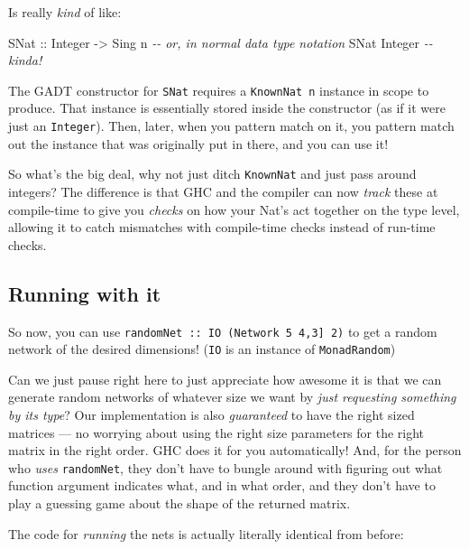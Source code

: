 \documentclass[]{article}
\newenvironment{Shaded}{}{}
\newcommand{\CommentTok}[1]{\textcolor[rgb]{0.38,0.63,0.69}{\textit{#1}}}
\newcommand{\DataTypeTok}[1]{\textcolor[rgb]{0.56,0.13,0.00}{#1}}
\newcommand{\NormalTok}[1]{#1}
\newcommand{\OtherTok}[1]{\textcolor[rgb]{0.00,0.44,0.13}{#1}}
\begin{document}
Is really \emph{kind} of like:

\begin{Shaded}
\begin{Highlighting}[]
\DataTypeTok{SNat}\OtherTok{ ::} \DataTypeTok{Integer} \OtherTok{{-}>} \DataTypeTok{Sing}\NormalTok{ n}
\CommentTok{{-}{-} or, in normal data type notation}
\DataTypeTok{SNat} \DataTypeTok{Integer}
\CommentTok{{-}{-} kinda!}
\end{Highlighting}
\end{Shaded}

The GADT constructor for \texttt{SNat} requires a \texttt{KnownNat\ n} instance
in scope to produce. That instance is essentially stored inside the constructor
(as if it were just an \texttt{Integer}). Then, later, when you pattern match on
it, you pattern match out the instance that was originally put in there, and you
can use it!

So what's the big deal, why not just ditch \texttt{KnownNat} and just pass
around integers? The difference is that GHC and the compiler can now
\emph{track} these at compile-time to give you \emph{checks} on how your Nat's
act together on the type level, allowing it to catch mismatches with
compile-time checks instead of run-time checks.

\hypertarget{running-with-it}{%
\subsection{Running with it}\label{running-with-it}}

So now, you can use
\texttt{randomNet\ ::\ IO\ (Network\ 5\ \textquotesingle{}{[}4,3{]}\ 2)} to get
a random network of the desired dimensions! (\texttt{IO} is an instance of
\texttt{MonadRandom})

Can we just pause right here to just appreciate how awesome it is that we can
generate random networks of whatever size we want by \emph{just requesting
something by its type}? Our implementation is also \emph{guaranteed} to have the
right sized matrices --- no worrying about using the right size parameters for
the right matrix in the right order. GHC does it for you automatically! And, for
the person who \emph{uses} \texttt{randomNet}, they don't have to bungle around
with figuring out what function argument indicates what, and in what order, and
they don't have to play a guessing game about the shape of the returned matrix.

The code for \emph{running} the nets is actually literally identical from
before:
\end{document}
